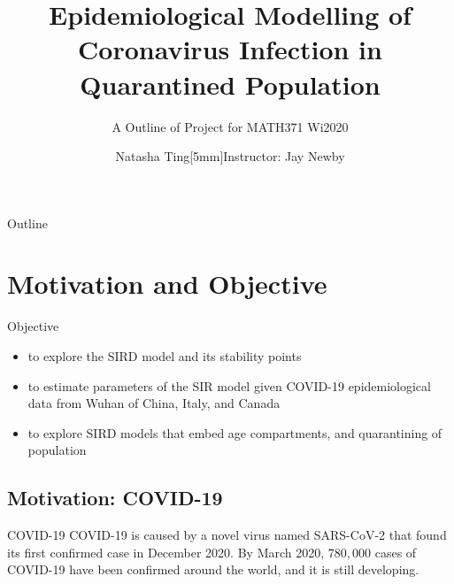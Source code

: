 \documentclass{beamer}
\title[Implicit Preferences] %
{Epidemiological Modelling of Coronavirus Infection in Quarantined Population}
\subtitle
{A Outline of Project for MATH371 Wi2020}
\author[natasha]{Natasha Ting[5mm]{\footnotesize Instructor: Jay Newby}}
\institute[University of Alberta] %
{
  \inst{}%
  Department of Mathematical and Statistical Sciences\\
  University of Alberta
 }
\date[outline] %
{}
\begin{document}
\begin{frame}
  \titlepage
\end{frame}

\begin{frame}{Outline}
  \tableofcontents
\end{frame}


\section{Motivation and Objective}

\begin{frame}{Objective}
	\begin{itemize}
	\item to explore the SIRD model and its stability points
	\item to estimate parameters of the SIR model given COVID-19 epidemiological data from Wuhan of China, Italy, and Canada
	\item to explore SIRD models that embed age compartments, and quarantining of population
	\end{itemize}
\end{frame}

\subsection{Motivation: COVID-19}
\begin{frame}{COVID-19}
	COVID-19 is caused by a novel virus named SARS-CoV-2 that found its first confirmed case in December 2020. By March 2020, $780,000$ cases of COVID-19 have been confirmed around the world, and it is still developing. \\
\end{frame}





\end{document}

